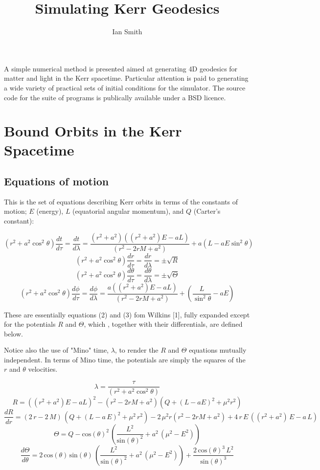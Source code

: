 \documentclass[11pt]{article}
\title{\textbf{Simulating Kerr Geodesics}}
\author{Ian Smith}
\date{}
\begin{document}
\maketitle

\abstract
A simple numerical method is presented aimed at generating 4D geodesics for matter and light in the Kerr spacetime.  Particular attention is paid to generating a wide variety of practical sets of initial conditions for the simulator.  The source code for the suite of programs is publically available under a BSD licence.

\section{Bound Orbits in the Kerr Spacetime}

\subsection {Equations of motion}

This is the set of equations describing Kerr orbits in terms of the constants of motion; $E$ (energy), $L$ (equatorial angular momentum), and $Q$ (Carter's constant):

$$
(r^2 + a^2 \cos^2\theta) \frac{d t}{d \tau} = \frac{d t}{d \lambda} = \frac{(r^2 + a^2) ((r^2 + a^2) E - aL)} {({r}^{2} - 2rM  + {a}^{2})} + a(L - aE \sin^2 \theta)
$$
$$
(r^2 + a^2 \cos^2\theta) \frac{d r}{d \tau} = \frac{d r}{d \lambda} = \pm \sqrt R
$$
$$
(r^2 + a^2 \cos^2\theta) \frac{d \theta}{d \tau} = \frac{d \theta}{d \lambda} = \pm \sqrt \Theta
$$
$$
(r^2 + a^2 \cos^2\theta) \frac{d \phi}{d \tau}= \frac{d \phi}{d \lambda} = \frac{a ((r^2 + a^2) E - aL)} {({r}^{2} - 2rM  + {a}^{2})} + (\frac {L} {\sin^2 \theta} -aE)
$$

These are essentially equations (2) and (3) fom Wilkins [1], fully expanded except for the potentials $R$ and $\Theta$, which , together with their differentials, are defined below.

Notice also the use of "Mino" time, $\lambda$, to render the $R$ and $\Theta$ equations mutually independent.  In terms of Mino time, the potentials are simply the squares of the $r$ and $\theta$ velocities.

$$
\lambda = \frac {\tau} {(r^2 + a^2 \cos^2\theta)}
$$
$$
R = ((r^2 + a^2) E - aL)^2 - (r^2 - 2rM  + a^{2}) ( Q+{\left( L - aE\right) }^{2}+{\mu}^{2}{r}^{2})
$$
$$
\frac{d R}{d r} = \left( 2\,r - 2\,M\right) \,\left( Q+{\left( L - a\,E\right) }^{2}+{\mu}^{2}\,{r}^{2}\right) - 2\,{\mu}^{2}r({r}^{2} - 2rM  + {a}^{2}) +4\,r\,E\,\left( \left( {r}^{2}+{a}^{2}\right) \,E - a\,L\right)
$$
$$
\Theta=Q - {\mathrm{cos}\left( \theta\right) }^{2}\,\left( \frac{{L}^{2}}{{\mathrm{sin}\left( \theta\right) }^{2}}+{a}^{2}\,\left( {\mu}^{2} - {E}^{2}\right) \right)
$$
$$
\frac{d \Theta}{d \theta} = 2\,\mathrm{cos}\left( \theta\right) \,\mathrm{sin}\left( \theta\right) \,\left( \frac{{L}^{2}}{{\mathrm{sin}\left( \theta\right) }^{2}}+{a}^{2}\,\left( {\mu}^{2} - {E}^{2}\right) \right) +\frac{2\,{\mathrm{cos}\left( \theta\right) }^{3}\,{L}^{2}}{{\mathrm{sin}\left( \theta\right) }^{3}}
$$
\end{document}

